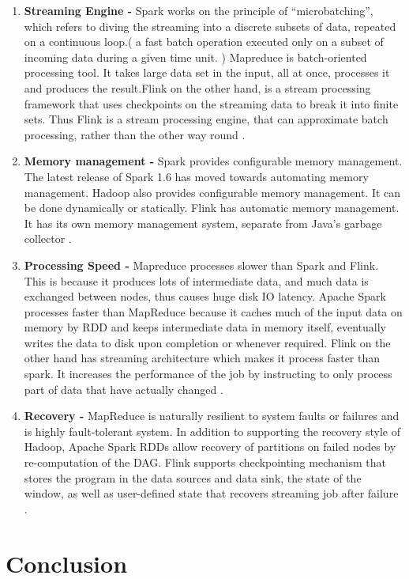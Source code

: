 \begin{enumerate}
    \item \textbf{Streaming Engine - }
    Spark works on the principle of ``microbatching'', which refers to diving the streaming into a discrete subsets of data, repeated on a continuous loop.( a fast batch operation executed only on a subset of incoming data during a given time unit. ) Mapreduce is batch-oriented processing tool. It takes large data set in the input, all at once, processes it and produces the result.Flink on the other hand, is a stream processing framework that uses checkpoints on the streaming data to break it into finite sets. Thus Flink is a stream processing engine, that can approximate batch processing, rather than the other way round \cite{link5}.
    \item \textbf{Memory management - }
    Spark provides configurable memory management. The latest release of Spark 1.6 has moved towards automating memory management. Hadoop also provides configurable memory management. It can be done dynamically or statically. Flink has automatic memory management. It has its own memory management system, separate from Java's garbage collector \cite{link5}.
    \item \textbf{Processing Speed - }
    Mapreduce processes slower than Spark and Flink. This is because it produces lots of intermediate data, and much data is exchanged between nodes, thus causes huge disk IO latency. Apache Spark processes faster than MapReduce because it caches much of the input data on memory by RDD and keeps intermediate data in memory itself, eventually writes the data to disk upon completion or whenever required. Flink on the other hand has streaming architecture which makes it process faster than spark. It increases the performance of the job by instructing to only process part of data that have actually changed \cite{link5}.
    \item \textbf{Recovery - }
    MapReduce is naturally resilient to system faults or failures and is highly fault-tolerant system. In addition to supporting the recovery style of Hadoop, Apache Spark RDDs allow recovery of partitions on failed nodes by re-computation of the DAG. Flink supports checkpointing mechanism that stores the program in the data sources and data sink, the state of the window, as well as user-defined state that recovers streaming job after failure \cite{link5}.
\end{enumerate}

\section{Conclusion}

